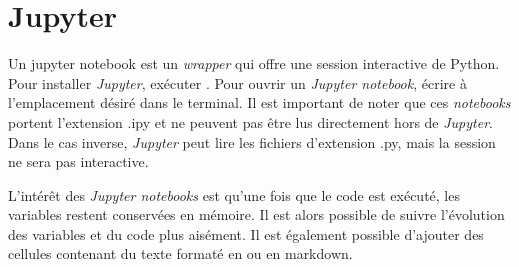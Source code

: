 \documentclass{article}
\begin{document}
\section{Jupyter}
Un jupyter notebook est un \textit{wrapper} qui offre une session interactive de Python. Pour installer \textit{Jupyter}, exécuter . Pour ouvrir un \textit{Jupyter notebook}, écrire  à l'emplacement désiré dans le terminal. Il est important de noter que ces \textit{notebooks} portent l'extension .ipy et ne peuvent pas être lus directement hors de \textit{Jupyter}. Dans le cas inverse, \textit{Jupyter} peut lire les fichiers d'extension .py, mais la session ne sera pas interactive.

L'intérêt des \textit{Jupyter notebooks} est qu'une fois que le code est exécuté, les variables restent conservées en mémoire. Il est alors possible de suivre l'évolution des variables et du code plus aisément. Il est également possible d'ajouter des cellules contenant du texte formaté en \latex ou en markdown. 
\end{document}
